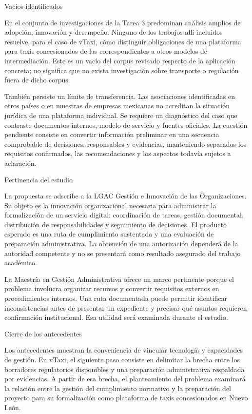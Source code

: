 {Vacíos identificados


En el conjunto de investigaciones de la Tarea 3 predominan análisis amplios de adopción, innovación y desempeño. Ninguno de los trabajos allí incluidos resuelve, para el caso de vTaxi, cómo distinguir obligaciones de una plataforma para taxis concesionados de las correspondientes a otros modelos de intermediación. Este es un vacío del corpus revisado respecto de la aplicación concreta; no significa que no exista investigación sobre transporte o regulación fuera de dicho corpus.


También persiste un límite de transferencia. Las asociaciones identificadas en otros países o en muestras de empresas mexicanas no acreditan la situación jurídica de una plataforma individual. Se requiere un diagnóstico del caso que contraste documentos internos, modelo de servicio y fuentes oficiales. La cuestión pendiente consiste en convertir información preliminar en una secuencia comprobable de decisiones, responsables y evidencias, manteniendo separados los requisitos confirmados, las recomendaciones y los aspectos todavía sujetos a aclaración.


Pertinencia del estudio


La propuesta se adscribe a la LGAC Gestión e Innovación de las Organizaciones. Su objeto es la innovación organizacional necesaria para administrar la formalización de un servicio digital: coordinación de tareas, gestión documental, distribución de responsabilidades y seguimiento de decisiones. El producto esperado es una ruta de cumplimiento sustentada y una evaluación de preparación administrativa. La obtención de una autorización dependerá de la autoridad competente y no se presentará como resultado asegurado del trabajo académico.


La Maestría en Gestión Administrativa ofrece un marco pertinente porque el problema involucra organizar recursos y convertir requisitos externos en procedimientos internos. Una ruta documentada puede permitir identificar inconsistencias antes de presentar un expediente y precisar qué asuntos requieren confirmación institucional. Esa utilidad será examinada durante el estudio.


Cierre de los antecedentes


Los antecedentes muestran la conveniencia de vincular tecnología y capacidades de gestión. En vTaxi, el siguiente paso consiste en delimitar la brecha entre los borradores regulatorios disponibles y una preparación administrativa respaldada por evidencias. A partir de esa brecha, el planteamiento del problema examinará la relación entre la gestión del cumplimiento normativo y la preparación del proyecto para su formalización como plataforma de taxis concesionados en Nuevo León.


}
